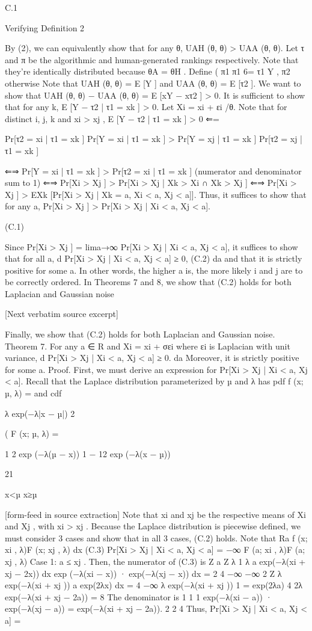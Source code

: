 \documentclass[10pt]{article}
\begin{document}
\begin{ReviewVerbatim}
C.1

Verifying Definition 2

By (2), we can equivalently show that for any θ, UAH (θ, θ) > UAA (θ, θ). Let τ and π be the algorithmic and
human-generated rankings respectively. Note that they’re identically distributed because θA = θH . Define
(
π1 π1 6= τ1
Y ,
π2 otherwise
Note that UAH (θ, θ) = E [Y ] and UAA (θ, θ) = E [τ2 ]. We want to show that UAH (θ, θ) − UAA (θ, θ) =
E [xY − xτ2 ] > 0. It is sufficient to show that for any k, E [Y − τ2 | τ1 = xk ] > 0. Let Xi = xi + εi /θ. Note
that for distinct i, j, k and xi > xj ,
E [Y − τ2 | τ1 = xk ] > 0 ⇐=

Pr[τ2 = xi | τ1 = xk ]
Pr[Y = xi | τ1 = xk ]
>
Pr[Y = xj | τ1 = xk ]
Pr[τ2 = xj | τ1 = xk ]

⇐⇒ Pr[Y = xi | τ1 = xk ] > Pr[τ2 = xi | τ1 = xk ]
(numerator and denominator sum to 1)
⇐⇒ Pr[Xi > Xj ] > Pr[Xi > Xj | Xk > Xi ∩ Xk > Xj ]
⇐⇒ Pr[Xi > Xj ] > EXk [Pr[Xi > Xj | Xk = a, Xi < a, Xj < a]].
Thus, it suffices to show that for any a,
Pr[Xi > Xj ] > Pr[Xi > Xj | Xi < a, Xj < a].

(C.1)

Since Pr[Xi > Xj ] = lima→∞ Pr[Xi > Xj | Xi < a, Xj < a], it suffices to show that for all a,
d
Pr[Xi > Xj | Xi < a, Xj < a] ≥ 0,
(C.2)
da
and that it is strictly positive for some a. In other words, the higher a is, the more likely i and j are to be
correctly ordered. In Theorems 7 and 8, we show that (C.2) holds for both Laplacian and Gaussian noise

[Next verbatim source excerpt]

Finally, we show that (C.2) holds for both Laplacian and Gaussian noise.
Theorem 7. For any a ∈ R and Xi = xi + σεi where εi is Laplacian with unit variance,
d
Pr[Xi > Xj | Xi < a, Xj < a] ≥ 0.
da
Moreover, it is strictly positive for some a.
Proof. First, we must derive an expression for Pr[Xi > Xj | Xi < a, Xj < a]. Recall that the Laplace
distribution parameterized by µ and λ has pdf
f (x; µ, λ) =
and cdf

λ
exp(−λ|x − µ|)
2

(
F (x; µ, λ) =

1
2 exp (−λ(µ − x))
1 − 12 exp (−λ(x − µ))

21

x<µ
x≥µ


[form-feed in source extraction]
Note that xi and xj be the respective means of Xi and Xj , with xi > xj . Because the Laplace distribution
is piecewise defined, we must consider 3 cases and show that in all 3 cases, (C.2) holds. Note that
Ra
f (x; xi , λ)F (x; xj , λ) dx
(C.3)
Pr[Xi > Xj | Xi < a, Xj < a] = −∞
F (a; xi , λ)F (a; xj , λ)
Case 1: a ≤ xj .
Then, the numerator of (C.3) is
Z a
Z
λ
1
λ a
exp(−λ(xi + xj − 2x)) dx
exp (−λ(xi − x)) · exp(−λ(xj − x)) dx =
2
4 −∞
−∞ 2
Z
λ exp(−λ(xi + xj )) a
exp(2λx) dx
=
4
−∞
λ exp(−λ(xi + xj )) 1
=
exp(2λa)
4
2λ
exp(−λ(xi + xj − 2a))
=
8
The denominator is
1
1
1
exp(−λ(xi − a)) · exp(−λ(xj − a)) = exp(−λ(xi + xj − 2a)).
2
2
4
Thus,
Pr[Xi > Xj | Xi < a, Xj < a] =


\end{ReviewVerbatim}
\end{document}
